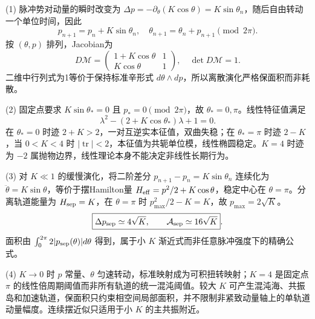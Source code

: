 (1) 脉冲势对动量的瞬时改变为 \(\Delta p=-\partial_\theta(K\cos\theta)=K\sin\theta_n\)，随后自由转动一个单位时间，因此
\[
\boxed{p_{n+1}=p_n+K\sin\theta_n,\quad
\theta_{n+1}=\theta_n+p_{n+1}\pmod{2\pi}}.
\]
按 \((\theta,p)\) 排列，Jacobian为
\[
D\mathcal M=\begin{pmatrix}1+K\cos\theta&1\\K\cos\theta&1\end{pmatrix},\quad\det D\mathcal M=1.
\]
二维中行列式为1等价于保持标准辛形式 \(d\theta\wedge dp\)，所以离散演化严格保面积而非耗散。

(2) 固定点要求 \(K\sin\theta_*=0\) 且 \(p_*=0\pmod{2\pi}\)，故 \(\theta_*=0,\pi\)。线性特征值满足
\[
\lambda^2-(2+K\cos\theta_*)\lambda+1=0.
\]
在 \(\theta_*=0\) 时迹 \(2+K>2\)，一对互逆实本征值，双曲失稳；在 \(\theta_*=\pi\) 时迹 \(2-K\)，当 \(0<K<4\) 时 \(|\operatorname{tr}|<2\)，本征值为共轭单位模，线性椭圆稳定。\(K=4\) 时迹为 \(-2\) 属抛物边界，线性理论本身不能决定非线性长期行为。

(3) 对 \(K\ll1\) 的缓慢演化，将二阶差分 \(p_{n+1}-p_n=K\sin\theta_n\) 连续化为 \(\ddot\theta=K\sin\theta\)，等价于摆Hamilton量 \(H_{\rm eff}=p^2/2+K\cos\theta\)，稳定中心在 \(\theta=\pi\)。分离轨道能量为 \(H_{\rm sep}=K\)，在 \(\theta=\pi\) 时
\(p_{\max}^2/2-K=K\)，故 \(p_{\max}=2\sqrt K\)。
\[
\boxed{\Delta p_{\rm sep}\simeq4\sqrt K,\qquad
\mathcal A_{\rm sep}\simeq16\sqrt K}.
\]
面积由 \(\int_0^{2\pi}2|p_{\rm sep}(\theta)|d\theta\) 得到，属于小 \(K\) 渐近式而非任意脉冲强度下的精确公式。

(4) \(K\to0\) 时 \(p\) 常量、\(\theta\) 匀速转动，标准映射成为可积扭转映射；\(K=4\) 是固定点 \(\pi\) 的线性倍周期阈值而非所有轨道的统一混沌阈值。较大 \(K\) 可产生混沌海、共振岛和加速轨道，保面积只约束相空间局部面积，并不限制非紧致动量轴上的单轨道动量幅度。连续摆近似只适用于小 \(K\) 的主共振附近。
